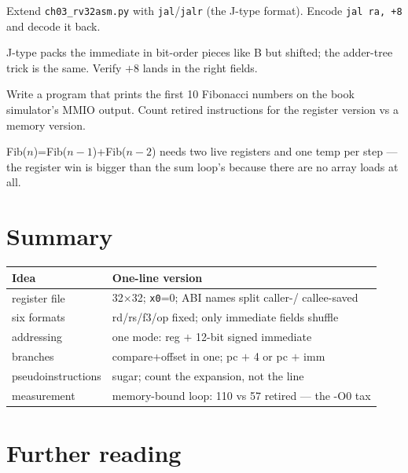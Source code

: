 \begin{exercise}[hard]\label{ex:h03b}
Extend \texttt{ch03\_rv32asm.py} with \texttt{jal}/\texttt{jalr}
(the J-type format). Encode \texttt{jal ra, +8} and decode it back.
\end{exercise}
\begin{solution}[hint]
J-type packs the immediate in bit-order pieces like B but shifted;
the adder-tree trick is the same. Verify $+8$ lands in the right
fields.
\end{solution}

\begin{exercise}[hard]\label{ex:h03c}
Write a program that prints the first 10 Fibonacci numbers on the
book simulator's MMIO output. Count retired instructions for the
register version vs a memory version.
\end{exercise}
\begin{solution}[hint]
Fib($n$)=Fib($n{-}1$)+Fib($n{-}2$) needs two live registers and one
temp per step --- the register win is bigger than the sum loop's
because there are no array loads at all.
\end{solution}

\section*{Summary}
\label{sec:summary03}

\begin{center}
\begin{tabularx}{\linewidth}{lX}
\toprule
\textbf{Idea} & \textbf{One-line version} \\
\midrule
register file & 32$\times$32; \texttt{x0}=0; ABI names split caller-/
callee-saved \\
six formats & rd/rs/f3/op fixed; only immediate fields shuffle \\
addressing & one mode: reg $+$ 12-bit signed immediate \\
branches & compare+offset in one; pc $+$ 4 or pc $+$ imm \\
pseudoinstructions & sugar; count the expansion, not the line \\
measurement & memory-bound loop: 110 vs 57 retired --- the -O0 tax \\
\bottomrule
\end{tabularx}
\end{center}

\section*{Further reading}
\label{sec:fr03}

